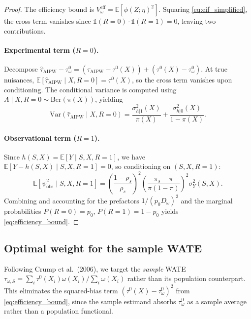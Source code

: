 \documentclass{article}
\theoremstyle{plain}
\theoremstyle{definition}
\theoremstyle{remark}
\newcommand{\1}{\mathds{1}}                %
\begin{document}
\begin{proof}
The efficiency bound is $V^{\text{eff}}_\omega = \mathbb{E}[\phi(Z;\eta)^2]$. Squaring
\eqref{eq:eif_simplified}, the cross term vanishes since
$\mathbb{1}(R=0)\cdot\mathbb{1}(R=1)=0$, leaving two contributions.

\paragraph{Experimental term ($R=0$).}
Decompose $\hat{\tau}_{\text{AIPW}} - \tau^0_\omega
= (\hat{\tau}_{\text{AIPW}} - \tau^0(X)) + (\tau^0(X) - \tau^0_\omega)$.
At true nuisances, $\mathbb{E}[\hat{\tau}_{\text{AIPW}} \mid X, R=0] = \tau^0(X)$, so the
cross term vanishes upon conditioning. The conditional variance is computed using
$A \mid X, R=0 \sim \mathrm{Ber}(\pi(X))$, yielding
\begin{equation}
\mathrm{Var}(\hat{\tau}_{\text{AIPW}} \mid X, R=0)
= \frac{\sigma^2_{h|1}(X)}{\pi(X)} + \frac{\sigma^2_{h|0}(X)}{1-\pi(X)}.
\end{equation}

\paragraph{Observational term ($R=1$).}
Since $h(S,X) = \mathbb{E}[Y \mid S, X, R=1]$, we have
$\mathbb{E}[Y - h(S,X) \mid S, X, R=1] = 0$, so conditioning on $(S, X, R=1)$:
\begin{equation}
\mathbb{E}[\psi_{\text{obs}}^2 \mid S,X,R=1]
= \left(\frac{1-\rho_s}{\rho_s}\right)^{\!2}
\left(\frac{\pi_s - \pi}{\pi(1-\pi)}\right)^{\!2} \sigma^2_Y(S,X).
\end{equation}
Combining and accounting for the prefactors $1/(p_0 D_\omega)^2$ and the marginal
probabilities $P(R=0)=p_0$, $P(R=1)=1-p_0$ yields \eqref{eq:efficiency_bound}.
\end{proof}

\subsection{Optimal weight for the sample WATE}
\label{sec:optimal_weight}

Following Crump et al.\ (2006), we target the \emph{sample} WATE
$\tau_{\omega,S} = \sum_i \tau^0(X_i)\omega(X_i) / \sum_i \omega(X_i)$ rather than its
population counterpart. This eliminates the squared-bias term
$(\tau^0(X) - \tau^0_\omega)^2$ from \eqref{eq:efficiency_bound}, since the sample
estimand absorbs $\tau^0_\omega$ as a sample average rather than a population functional.
\end{document}
